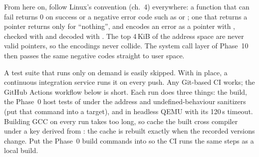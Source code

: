 \documentclass[11pt,a4paper]{article}
\begin{document}
\begin{tipbox}
From here on, follow Linux's convention (\LKP ch.~4) everywhere: a function that can fail returns 0 on success or a
negative error code such as  or ; one that returns a pointer returns  only for
``nothing'', and encodes an error as a pointer with , checked with  and
decoded with . The top 4\,KiB of the address space are never valid pointers, so the encodings never
collide. The system call layer of Phase~10 then passes the same negative codes straight to user space.
\end{tipbox}

A test suite that runs only on demand is easily skipped. With  in place, a
continuous integration service runs it on every push. Any Git-based CI works; the GitHub Actions workflow below is
short. Each run does three things: the  build, the Phase~0 host tests of  under the address
and undefined-behaviour sanitizers (put that command into a  target), and  in headless
QEMU with its 120\,s timeout. Building GCC on every run takes too long, so cache the built cross compiler under a key
derived from : the cache is rebuilt exactly when the recorded versions change. Put the
Phase~0 build commands into  so the CI runs the same steps as a local build.

\end{document}
